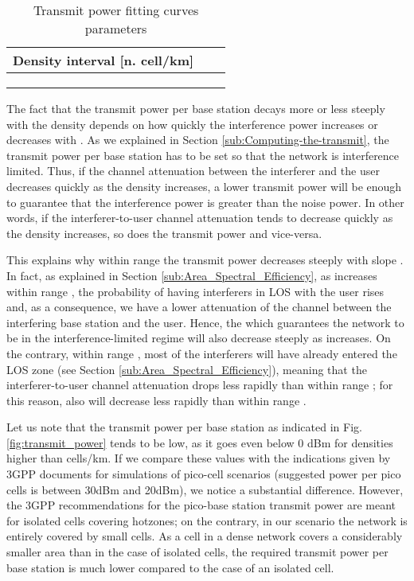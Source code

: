 \documentclass[twocoumn]{IEEEtran}
\begin{document}
\begin{table}[tbph]
\caption{Transmit power fitting curves parameters}
\label{table:POWERresults}
\centering
\begin{tabular}{|c|c|c|}
\hline 
Density interval [n. cell/km] &   &  \tabularnewline
\hline 
\hline 
 &   &  \tabularnewline
\hline 
 &   &  \tabularnewline
\hline 
 &   &  \tabularnewline
\hline 
\end{tabular}

\end{table}
The fact that the transmit power per base station decays more or less steeply with the density  depends on how quickly the interference power increases or decreases with . As we explained in Section \ref{sub:Computing-the-transmit}, the transmit power per base station  has to be set so that the network is interference limited. Thus, if the channel attenuation between the interferer and the user decreases quickly as the density increases, a lower transmit power will be enough to guarantee that the interference power is greater than the noise power.
In other words, if the interferer-to-user channel attenuation tends to decrease quickly as the density increases, so does the transmit power and vice-versa.

This explains why within range   the transmit power  decreases steeply with slope . In fact, as explained in Section \ref{sub:Area_Spectral_Efficiency}, as  increases within range  , the probability of having interferers in LOS with the user rises and, as a consequence, we have a lower attenuation of the channel between the interfering base station and the user.
Hence, the  which guarantees the network to be in the interference-limited regime will also decrease steeply as  increases.
On the contrary, within range , most of the interferers will have already entered the LOS zone (see Section \ref{sub:Area_Spectral_Efficiency}), meaning that the interferer-to-user channel attenuation drops less rapidly than within range ; for this reason, also  will decrease less rapidly than within range .
  

Let us note that the transmit power per base station as indicated
in Fig. \ref{fig:transmit_power} tends to be low, as it goes
even below 0 dBm for densities higher than cells/km.
If we compare these values with the indications given by 3GPP documents
\cite{3GPP36814} for simulations of pico-cell scenarios (suggested
power per pico cells is between 30dBm and 20dBm), we notice a substantial
difference. However, the 3GPP recommendations for the pico-base station
transmit power are meant for isolated cells covering hotzones; on
the contrary, in our scenario the network is entirely covered by small
cells. As a cell in a dense network  covers a considerably smaller
area than in the case of isolated cells, the required transmit power
per base station is much lower compared to the case of an isolated
cell. 
\end{document}
